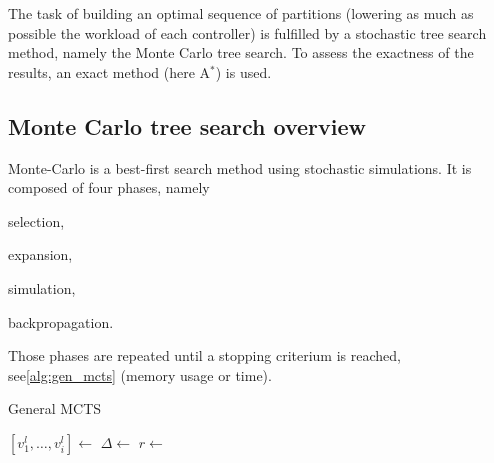 \documentclass[twoside,twocolumn]{article}
\begin{document}
The task of building an optimal sequence of partitions (lowering
as much as possible the workload of each controller) is fulfilled by a
stochastic tree search method, namely the Monte Carlo tree search. To assess the
exactness of the results, an exact method (here A\(^*\)) is used.

\subsection{Monte Carlo tree search overview}
Monte-Carlo is a best-first search method using stochastic simulations. It is
composed of four phases, namely
\begin{compactenum}
    \item selection,
    \item expansion,
    \item simulation,
    \item backpropagation.
\end{compactenum}
Those phases are repeated until a stopping criterium is reached,
see\ref{alg:gen_mcts} (memory usage or time).
\begin{algorithm}
    \caption{General MCTS~\cite{browne2012survey}}\label{alg:gen_mcts}
    \begin{algorithmic}
        \State{} \([v^l_1, \dots, v^l_i] \gets\) 
        \State{} \(\Delta \gets\) 
        \State{} \(r \gets\) 
        \State{} 
        \EndWhile{}
        \EndProcedure{}
    \end{algorithmic}
\end{algorithm}
\end{document}
